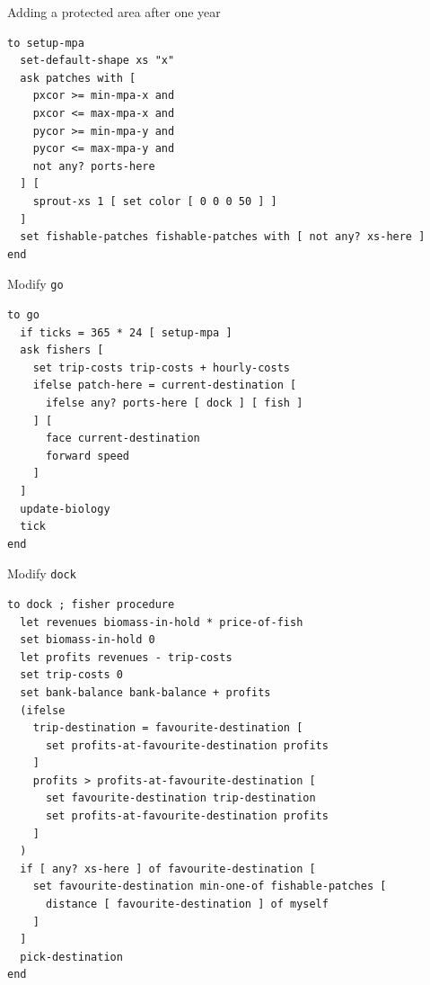 \documentclass[table, 14pt, aspectratio=169]{beamer}
\begin{document}
\begin{frame}[fragile=singleslide]{Adding a protected area after one year}
  \begin{adjustbox}{max height=0.8\textheight, max width = \linewidth}
    \begin{verbatim}
to setup-mpa
  set-default-shape xs "x"
  ask patches with [ 
    pxcor >= min-mpa-x and 
    pxcor <= max-mpa-x and 
    pycor >= min-mpa-y and
    pycor <= max-mpa-y and
    not any? ports-here
  ] [
    sprout-xs 1 [ set color [ 0 0 0 50 ] ]
  ]
  set fishable-patches fishable-patches with [ not any? xs-here ]
end
    \end{verbatim}
  \end{adjustbox}
\end{frame}

\begin{frame}[fragile=singleslide]{Modify \texttt{go}}
  \begin{adjustbox}{max height=0.8\textheight, max width = \linewidth}
    \begin{verbatim}
to go
  if ticks = 365 * 24 [ setup-mpa ]
  ask fishers [
    set trip-costs trip-costs + hourly-costs
    ifelse patch-here = current-destination [
      ifelse any? ports-here [ dock ] [ fish ]
    ] [
      face current-destination
      forward speed
    ]
  ]
  update-biology
  tick
end
    \end{verbatim}
  \end{adjustbox}
\end{frame}

\begin{frame}[fragile=singleslide]{Modify \texttt{dock}}
    \scriptsize
    \begin{verbatim}
to dock ; fisher procedure
  let revenues biomass-in-hold * price-of-fish
  set biomass-in-hold 0
  let profits revenues - trip-costs
  set trip-costs 0
  set bank-balance bank-balance + profits
  (ifelse
    trip-destination = favourite-destination [
      set profits-at-favourite-destination profits
    ]
    profits > profits-at-favourite-destination [
      set favourite-destination trip-destination
      set profits-at-favourite-destination profits
    ]
  )
  if [ any? xs-here ] of favourite-destination [
    set favourite-destination min-one-of fishable-patches [ 
      distance [ favourite-destination ] of myself
    ]
  ]
  pick-destination
end
    \end{verbatim}
\end{frame}
\end{document}
